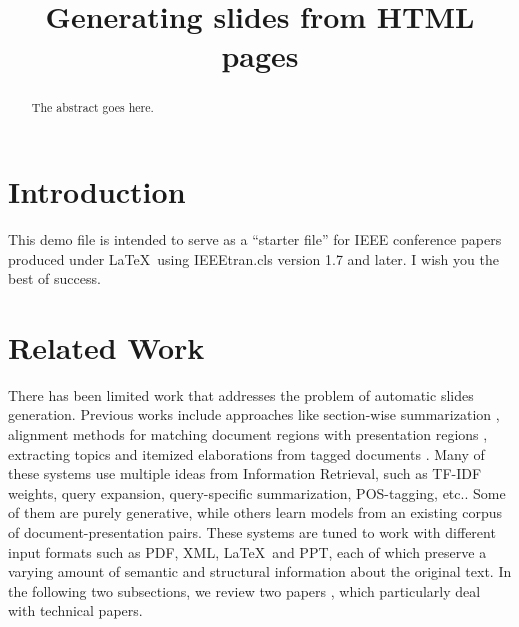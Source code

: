 \documentclass[conference]{IEEEtran}
\begin{document}
%
\title{Generating slides from HTML pages}


\author{
\and
{}
\and
{}
}


\maketitle


\begin{abstract}
The abstract goes here.
\end{abstract}


\section{Introduction}
This demo file is intended to serve as a ``starter file''
for IEEE conference papers produced under \LaTeX\ using
IEEEtran.cls version 1.7 and later.
I wish you the best of success. \cite{test}

\section{Related Work}
There has been limited work that addresses the problem of automatic slides generation.
Previous works include approaches like section-wise summarization \cite{sravanthi},
alignment methods for matching document regions with presentation regions \cite{brandon},
extracting topics and itemized elaborations from tagged documents \cite{utiyama}.
Many of these systems use multiple ideas from Information Retrieval, such as TF-IDF weights,
query expansion, query-specific summarization, POS-tagging, etc..
Some of them are purely generative, while others learn models from an existing corpus of
document-presentation pairs. These systems are tuned to work with different input formats
such as PDF, XML, \LaTeX\ and PPT, each of which preserve a varying amount of semantic and
structural information about the original text. In the following two subsections, we review
two papers \cite{sravanthi},\cite{brandon} which particularly deal with technical papers.
\end{document}
